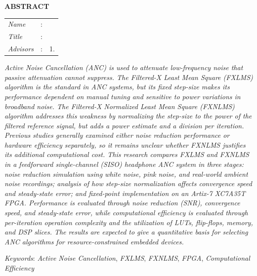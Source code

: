 \begin{center}
  \large\textbf{ABSTRACT}
\end{center}


\vspace{2ex}

\begingroup
\setlength{\tabcolsep}{0pt}

\noindent
\begin{tabularx}{\textwidth}{l >{\centering}m{3em} X}
  \emph{Name}     & : & \name{}         \\

  \emph{Title}    & : & \engtatitle{}   \\

  \emph{Advisors} & : & 1. \advisor{}   \\
\end{tabularx}
\endgroup

\emph{Active Noise Cancellation (ANC) is used to attenuate low-frequency noise that passive attenuation cannot suppress. The Filtered-X Least Mean Square (FXLMS) algorithm is the standard in ANC systems, but its fixed step-size makes its performance dependent on manual tuning and sensitive to power variations in broadband noise. The Filtered-X Normalized Least Mean Square (FXNLMS) algorithm addresses this weakness by normalizing the step-size to the power of the filtered reference signal, but adds a power estimate and a division per iteration. Previous studies generally examined either noise reduction performance or hardware efficiency separately, so it remains unclear whether FXNLMS justifies its additional computational cost. This research compares FXLMS and FXNLMS in a feedforward single-channel (SISO) headphone ANC system in three stages: noise reduction simulation using white noise, pink noise, and real-world ambient noise recordings; analysis of how step-size normalization affects convergence speed and steady-state error; and fixed-point implementation on an Artix-7 XC7A35T FPGA. Performance is evaluated through noise reduction (SNR), convergence speed, and steady-state error, while computational efficiency is evaluated through per-iteration operation complexity and the utilization of LUTs, flip-flops, memory, and DSP slices. The results are expected to give a quantitative basis for selecting ANC algorithms for resource-constrained embedded devices.}

\emph{Keywords}: \emph{Active Noise Cancellation}, \emph{FXLMS}, \emph{FXNLMS}, \emph{FPGA}, \emph{Computational Efficiency}